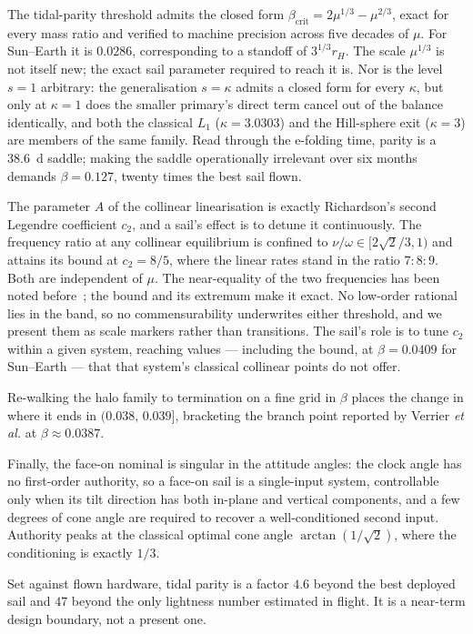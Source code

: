 \documentclass[pdflatex,sn-mathphys-num]{sn-jnl}
\begin{document}
The tidal-parity threshold admits the closed form
$\beta_{\mathrm{crit}}=2\mu^{1/3}-\mu^{2/3}$, exact for every mass ratio and
verified to machine precision across five decades of $\mu$. For Sun--Earth it is
$0.0286$, corresponding to a standoff of $3^{1/3}r_H$. The scale $\mu^{1/3}$ is
not itself new; the exact sail parameter required to reach it is. Nor is the
level $s=1$ arbitrary: the generalisation $s=\kappa$ admits a closed form for
every $\kappa$, but only at $\kappa=1$ does the smaller primary's direct term
cancel out of the balance identically, and both the classical $L_1$
($\kappa=3.0303$) and the Hill-sphere exit ($\kappa=3$) are members of the same
family. Read through the e-folding time, parity is a \SI{38.6}{\day} saddle;
making the saddle operationally irrelevant over six months demands
$\beta=0.127$, twenty times the best sail flown.

The parameter $A$ of the collinear linearisation is exactly Richardson's
second Legendre coefficient $c_2$, and a sail's effect is to detune it
continuously. The frequency ratio at any collinear equilibrium is confined to
$\nu/\omega\in[2\sqrt2/3,1)$ and attains its bound at $c_2=8/5$, where the
linear rates stand in the ratio $7:8:9$. Both are independent of $\mu$. The
near-equality of the two frequencies has been noted
before~\cite{ceccaroni2016physd}; the bound and its extremum make it exact. No
low-order rational lies in the band, so no commensurability underwrites either
threshold, and we present them as scale markers rather than transitions. The
sail's role is to tune $c_2$ within a given system, reaching values ---
including the bound, at $\beta=0.0409$ for Sun--Earth --- that that system's
classical collinear points do not offer.

Re-walking the halo family to termination on a fine grid in $\beta$ places
the change in where it ends in $(0.038,\,0.039]$, bracketing the branch point
reported by Verrier \emph{et al.} at $\beta\approx0.0387$.

Finally, the face-on nominal is singular in the attitude angles: the clock
angle has no first-order authority, so a face-on sail is a single-input system,
controllable only when its tilt direction has both in-plane and vertical
components, and a few degrees of cone angle are required to recover a
well-conditioned second input. Authority peaks at the classical optimal
cone angle $\arctan(1/\sqrt2)$, where the conditioning is exactly $1/3$.

Set against flown hardware, tidal parity is a factor $4.6$ beyond the best
deployed sail and $47$ beyond the only lightness number estimated in flight. It is a
near-term design boundary, not a present one.
\end{document}
